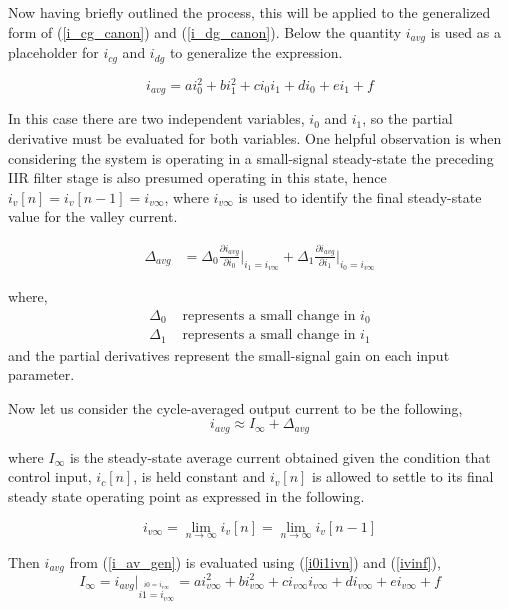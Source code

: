 \documentclass[conference]{IEEEtran}
\begin{document}
Now having briefly outlined the process, this will be applied to the generalized form of (\ref{i_cg_canon}) and (\ref{i_dg_canon}). Below the quantity $i_{avg}$ is used as a placeholder for $i_{cg}$ and $i_{dg}$ to generalize the expression.

\begin{equation}
i_{avg} = a i_0^2+b i_1^2+c i_0i_1+d i_0+e i_1+f  \label{i_av_gen}
\end{equation}

In this case there are two independent variables, $i_0$ and $i_1$, so the partial derivative must be evaluated for both variables. One helpful observation is when considering the system is operating in a small-signal steady-state the preceding IIR filter stage is also presumed operating in this state, hence $i_v[n] = i_v[n-1] = i_{v\infty}$, where $i_{v\infty}$ is used to identify the final steady-state value for the valley current.

\begin{align}
\Delta{_{avg}} &= \Delta{_0}\frac{\partial i_{avg}}{\partial i_0}\bigg|_{i_1=i_{v\infty}} + \Delta{_1}\frac{\partial i_{avg}}{\partial i_1}\bigg|_{i_0=i_{v\infty}} 
  \label{i_av_deriv}
\end{align}

where,
\begin{align}
	\Delta_0 & \text{ represents a small change in } i_0 \nonumber \\
	\Delta_1 & \text{ represents a small change in } i_1 
	\label{deltai0i1}
\end{align}
and the partial derivatives represent the small-signal gain on each input parameter.

Now let us consider the cycle-averaged output current to be the following,
\begin{equation}	
	i_{avg} \approx I_{\infty} + \Delta_{avg}
\end{equation}

where $I_{\infty}$ is the steady-state average current obtained given the condition that control input, $i_c[n]$, is held constant and $i_v[n]$ is allowed to settle to its final steady state operating point as expressed in the following.

\begin{equation}
	i_{v\infty} = \lim_{n \to \infty} i_{v}[n] = \lim_{n \to \infty}  i_{v}[n-1]
	\label{ivinf}
\end{equation}

Then $i_{avg}$ from (\ref{i_av_gen}) is evaluated using (\ref{i0i1ivn}) and (\ref{ivinf}),
\begin{equation}
	I_{\infty} = i_{avg} \bigg|_{\stackrel{i0=i_{v \infty}}{i1=i_{v \infty}}} = a i_{v \infty}^2+b i_{v \infty}^2+c i_{v \infty}i_{v \infty}+d i_{v \infty}+e i_{v \infty}+f 
\end{equation}
\end{document}
